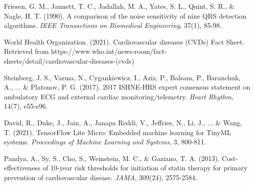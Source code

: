 \documentclass[12pt,a4paper]{article}
\begin{document}
\begin{thebibliography}{99}
Friesen, G. M., Jannett, T. C., Jadallah, M. A., Yates, S. L., Quint, S. R., \& Nagle, H. T. (1990). A comparison of the noise sensitivity of nine QRS detection algorithms. \textit{IEEE Transactions on Biomedical Engineering}, 37(1), 85-98.

World Health Organization. (2021). Cardiovascular diseases (CVDs) Fact Sheet. Retrieved from https://www.who.int/news-room/fact-sheets/detail/cardiovascular-diseases-(cvds)

Steinberg, J. S., Varma, N., Cygankiewicz, I., Aziz, P., Balsam, P., Baranchuk, A., ... \& Platonov, P. G. (2017). 2017 ISHNE-HRS expert consensus statement on ambulatory ECG and external cardiac monitoring/telemetry. \textit{Heart Rhythm}, 14(7), e55-e96.

David, R., Duke, J., Jain, A., Janapa Reddi, V., Jeffries, N., Li, J., ... \& Wang, T. (2021). TensorFlow Lite Micro: Embedded machine learning for TinyML systems. \textit{Proceedings of Machine Learning and Systems}, 3, 800-811.

Pandya, A., Sy, S., Cho, S., Weinstein, M. C., \& Gaziano, T. A. (2013). Cost-effectiveness of 10-year risk thresholds for initiation of statin therapy for primary prevention of cardiovascular disease. \textit{JAMA}, 309(24), 2575-2584.

\end{thebibliography}
\end{document}

